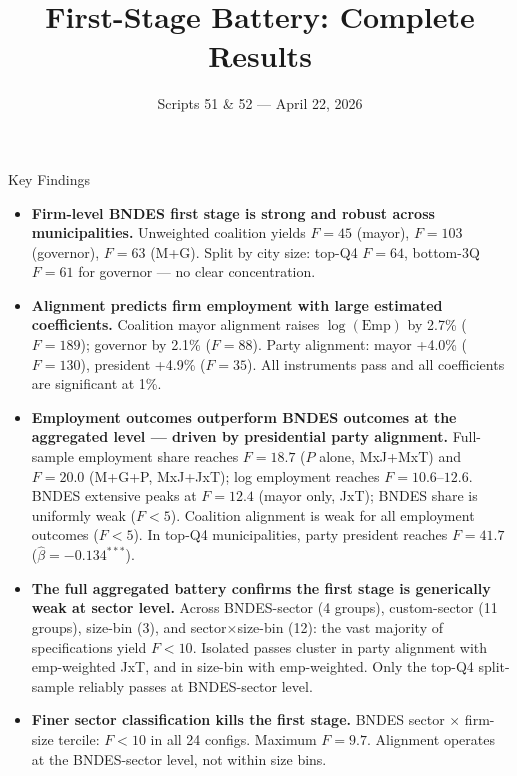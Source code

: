 \documentclass[aspectratio=169,10pt]{beamer}
\title{First-Stage Battery: Complete Results}
\subtitle{Scripts 51 \& 52 --- April 22, 2026}
\author{}
\date{}
\begin{document}
\begin{frame}
\titlepage
\end{frame}


\begin{frame}[t,shrink=15]{Key Findings}
\begin{itemize}\setlength{\itemsep}{0.25em}

  \item \textbf{Firm-level BNDES first stage is strong and robust across municipalities.}
    Unweighted coalition yields $F=45$ (mayor), $F=103$ (governor), $F=63$
    (M+G).  Split by city size: top-Q4 $F=64$, bottom-3Q $F=61$ for governor
    --- no clear concentration.

  \item \textbf{Alignment predicts firm employment with large
    estimated coefficients.}
    Coalition mayor alignment raises $\log(\text{Emp})$ by 2.7\% ($F=189$);
    governor by 2.1\% ($F=88$).  Party alignment: mayor +4.0\% ($F=130$),
    president +4.9\% ($F=35$).  All instruments pass and all coefficients
    are significant at 1\%.

  \item \textbf{Employment outcomes outperform BNDES outcomes at the
    aggregated level --- driven by presidential party alignment.}
    Full-sample employment share reaches $F=18.7$ ($P$ alone, MxJ+MxT) and
    $F=20.0$ (M+G+P, MxJ+JxT); log employment reaches $F=10.6$--$12.6$.
    BNDES extensive peaks at $F=12.4$ (mayor only, JxT); BNDES share
    is uniformly weak ($F<5$).  Coalition alignment is weak for all
    employment outcomes ($F<5$).  In top-Q4 municipalities, party president
    reaches $F=41.7$ ($\hat\beta=-0.134^{***}$).

  \item \textbf{The full aggregated battery confirms the first stage is
    generically weak at sector level.}
    Across BNDES-sector (4 groups), custom-sector (11 groups), size-bin (3),
    and sector$\times$size-bin (12): the vast majority of specifications
    yield $F<10$.  Isolated passes cluster in party alignment with
    emp-weighted JxT, and in size-bin with emp-weighted.  Only the
    top-Q4 split-sample reliably passes at BNDES-sector level.

  \item \textbf{Finer sector classification kills the first stage.}
    BNDES sector $\times$ firm-size tercile: $F<10$ in all 24 configs.
    Maximum $F=9.7$.  Alignment operates at the BNDES-sector level,
    not within size bins.

\end{itemize}
\end{frame}
\end{document}
